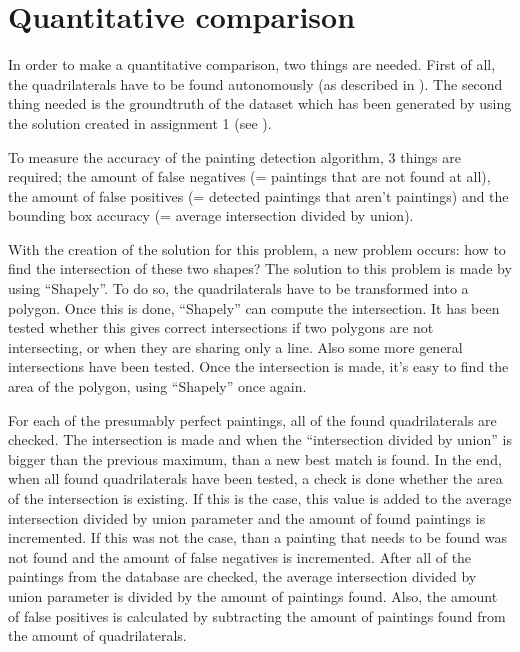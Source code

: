 \section{Quantitative comparison}
In order to make a quantitative comparison, two things are needed. First of all, the quadrilaterals have to be found autonomously (as described in ). The second thing needed is the groundtruth of the dataset which has been generated by using the solution created in assignment 1 (see ).

To measure the accuracy of the painting detection algorithm, 3 things are required; the amount of false negatives (= paintings that are not found at all), the amount of false positives (= detected paintings that aren't paintings) and the bounding box accuracy (= average intersection divided by union).

With the creation of the solution for this problem, a new problem occurs: how to find the intersection of these two shapes? The solution to this problem is made by using ``Shapely''. To do so, the quadrilaterals have to be transformed into a polygon. Once this is done, ``Shapely'' can compute the intersection. It has been tested whether this gives correct intersections if two polygons are not intersecting, or when they are sharing only a line. Also some more general intersections have been tested. Once the intersection is made, it's easy to find the area of the polygon, using ``Shapely'' once again.

For each of the presumably perfect paintings, all of the found quadrilaterals are checked. The intersection is made and when the ``intersection divided by union'' is bigger than the previous maximum, than a new best match is found. In the end, when all found quadrilaterals have been tested, a check is done whether the area of the intersection is existing. If this is the case, this value is added to the average intersection divided by union parameter and the amount of found paintings is incremented. If this was not the case, than a painting that needs to be found was not found and the amount of false negatives is incremented. After all of the paintings from the database are checked, the average intersection divided by union parameter is divided by the amount of paintings found. Also, the amount of false positives is calculated by subtracting the amount of paintings found from the amount of quadrilaterals.

